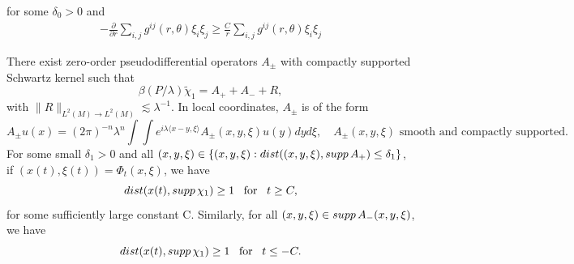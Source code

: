 \documentclass[10pt,a4paper]{amsart}
\newcommand{\la}{\lambda}
\begin{document}
for some $\delta_0>0$ and \begin{align}\label{assumption2}
    -\frac{\partial}{\partial r}\sum_{i,j}g^{ij}(r,\theta)\xi_i\xi_j\geq \frac{C}{r}\sum_{i,j}g^{ij}(r,\theta)\xi_i\xi_j
\end{align}

\begin{lemma}
    There exist zero-order pseudodifferential operators $A_\pm$ {with compactly supported Schwartz kernel} such that 
{
\begin{equation}\label{eq:lem2.8}
\beta(P/\la)\tilde\chi_1=A_++ A_-+R,
\end{equation} 
}with
$ \|R\|_{L^2(M)\to L^2(M)}\lesssim\la^{-1}.
$
{In local coordinates, $A_{\pm}$ is of the form
\begin{equation}
    A_{\pm} u(x) = (2\pi)^{-n}\la^n\int\int e^{i\la\langle x-y,\xi \rangle} A_{\pm}(x,y,\xi)u(y) dyd\xi,\quad A_{\pm}(x,y,\xi)\text{ smooth and compactly supported}.
\end{equation}
}
For some small $\delta_1>0$ and all $(x,y,\xi)\in \{(x,y,\xi):\textnormal{dist}((x,y,\xi),\textnormal{supp}\,A_+)\leq\delta_1\}$, if $(x(t),\xi(t))=\Phi_t(x,\xi)$, we have 
\begin{equation}\label{6a}
   \textnormal{dist}( x(t), \textnormal{supp}\,\chi_1)\ge 1  \,\,\,\text{ for }\,\,\,t \ge C,
\end{equation}
for some sufficiently large constant C. Similarly, for all $(x, y,\xi)\in \textnormal{supp}\, A_-(x,y,\xi)$,  we have 
\begin{equation}\label{7a}
   \textnormal{dist}( x(t), \textnormal{supp}\,\chi_1)\ge 1 \,\,\,\text{ for }\,\,\,t\le -C.
\end{equation}
\end{lemma}
\end{document}
